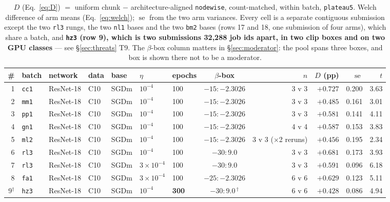 \documentclass[10pt,letterpaper]{article}
\newcommand{\Dstat}{D}                         %
\newcommand{\plateau}{\texttt{plateau5}}
\newcommand{\arm}[1]{\texttt{#1}}
\DeclareMathOperator{\se}{se}
\begin{document}
\begin{table}[htbp]
\centering
\footnotesize
\setlength{\tabcolsep}{3.5pt}
\caption{$\Dstat$ (Eq.~\ref{eq:D}) $=$ uniform chunk $-$ architecture-aligned \arm{nodewise},
count-matched, within batch, \plateau. Welch difference of arm means (Eq.~\ref{eq:welch}); $\se$
from the two arm variances. Every cell is a separate contiguous submission except the two
\arm{rl3} rungs, the two \arm{nl1} bases and the two \arm{bm2} bases (rows 17 and 18, one
submission of four arms), which share a batch, and \textbf{\arm{hz3} (row 9),
which is two submissions 32{,}288 job ids apart, in two clip boxes and on two GPU classes} ---
see \S\ref{sec:threats} T9. The $\beta$-box column matters in \S\ref{sec:moderator}: the pool
spans three boxes, and box is shown there not to be a moderator.}
\label{tab:D}
\begin{tabular}{@{}rllllllcrrrr@{}}
\toprule
\# & batch & network & data & base & $\eta$ & epochs & $\beta$-box & $n$ &
  \textbf{$\Dstat$ (pp)} & $\se$ & $t$ \\
\midrule
1  & \arm{cc1} & ResNet-18 & C10 & SGDm & $10^{-4}$ & 100 & $-15{:}{-}2.3026$ & 3 v 3 &
     $\mathbf{+0.727}$ & 0.200 & 3.63 \\
2  & \arm{mm1} & ResNet-18 & C10 & SGDm & $10^{-4}$ & 100 & $-15{:}{-}2.3026$ & 3 v 3 &
     $\mathbf{+0.485}$ & 0.161 & 3.01 \\
3  & \arm{pp1} & ResNet-18 & C10 & SGDm & $10^{-4}$ & 100 & $-15{:}{-}2.3026$ & 3 v 3 &
     $\mathbf{+0.581}$ & 0.141 & 4.11 \\
4  & \arm{gn1} & ResNet-18 & C10 & SGDm & $10^{-4}$ & 100 & $-15{:}{-}2.3026$ & 4 v 4 &
     $\mathbf{+0.587}$ & 0.153 & 3.83 \\
5  & \arm{ml2} & ResNet-18 & C10 & SGDm & $10^{-4}$ & 100 & $-15{:}{-}2.3026$ &
     3 v 3 ($\times$2 reruns) & $\mathbf{+0.456}$ & 0.195 & 2.34 \\
6  & \arm{rl3} & ResNet-18 & C10 & SGDm & $10^{-4}$ & 100 & $-30{:}9.0$ & 3 v 3 &
     $\mathbf{+0.681}$ & 0.173 & 3.93 \\
7  & \arm{rl3} & ResNet-18 & C10 & SGDm & $3{\times}10^{-4}$ & 100 & $-30{:}9.0$ & 3 v 3 &
     $\mathbf{+0.591}$ & 0.096 & 6.18 \\
8  & \arm{fa1} & ResNet-18 & C10 & SGDm & $3{\times}10^{-4}$ & 100 & $-25{:}{-}2.3026$ & 6 v 6 &
     $\mathbf{+0.629}$ & 0.123 & 5.11 \\
9$^{\dagger}$ & \arm{hz3} & ResNet-18 & C10 & SGDm & $10^{-4}$ & \textbf{300} &
     $-30{:}9.0$\,$^{\dagger}$ & 6 v 6 & $\mathbf{+0.428}$ & 0.086 & 4.94 \\

\end{tabular}
\end{table}
\end{document}
